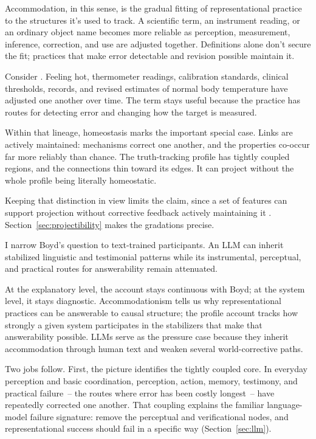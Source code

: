 \documentclass[12pt]{article}
\begin{document}
Accommodation, in this sense, is the gradual fitting of representational practice to the
structures it's used to track. A scientific term, an instrument reading, or an ordinary
object name becomes more reliable as perception, measurement, inference, correction, and
use are adjusted together. Definitions alone don't secure the fit; practices that make
error detectable and revision possible maintain it.

Consider . Feeling hot, thermometer readings,
calibration standards, clinical thresholds, records, and revised estimates of normal body
temperature have adjusted one another over time. The term stays useful because the
practice has routes for detecting error and changing how the target is measured.

Within that lineage, homeostasis marks the important special case. Links are actively
maintained: mechanisms correct one another, and the properties co-occur far more reliably
than chance. The truth-tracking profile has tightly coupled regions, and the connections
thin toward its edges. It can project without the whole profile being literally
homeostatic.

Keeping that distinction in view limits the claim, since a set of features can support
projection without corrective feedback actively maintaining it
\citep{reynolds2026notEveryStableCluster}.
Section~\ref{sec:projectibility} makes the gradations precise.

I narrow Boyd's question to text-trained participants. An LLM can inherit stabilized
linguistic and testimonial patterns while its instrumental, perceptual, and practical
routes for answerability remain attenuated.

At the explanatory level, the account stays continuous with Boyd; at the system level, it
stays diagnostic. Accommodationism tells us why representational practices can be
answerable to causal structure; the profile account tracks how strongly a given system
participates in the stabilizers that make that answerability possible.
LLMs serve as the pressure case because they inherit accommodation through human text and
weaken several world-corrective paths.

Two jobs follow. First, the picture identifies the tightly coupled core. In everyday
perception and basic coordination, perception, action, memory, testimony, and practical
failure~-- the routes where error has been costly longest~-- have repeatedly corrected one
another. That coupling explains the familiar language-model failure signature: remove the
perceptual and verificational nodes, and representational success should fail in a
specific way (Section~\ref{sec:llm}).
\end{document}
